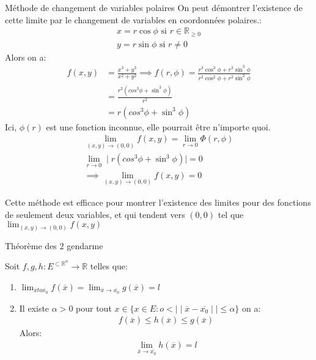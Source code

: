  \begin{parag}{Méthode de changement de variables polaires}
     On peut démontrer l'existence de cette limite par le changement de variables en coordonnées polaires.:
     \begin{align*}
         x = r\cos \phi \text{ si } r \in \mathbb{R}_{ \geq 0}\\
         y = r\sin \phi \text{ si } r \neq 0
     \end{align*}
     Alors on a:
     \begin{align*}
         f(x, y) &= \frac{x^3 + y^3}{x^2 + y^2} \implies f(r, \phi) = \frac{r^3\cos^3\phi + r^3\sin^3\phi}{r^2\cos^2\phi + r^2\sin^2\phi}\\
         &= \frac{r^2(cos^3\phi + \sin^3\phi)}{r^2}\\
         &= r(cos^3\phi + \sin^3\phi)
     \end{align*}
     Ici, $\phi(r)$ est une fonction inconnue, elle pourrait être n'importe quoi.
     \begin{align*}
         \lim_{(x, y) \to (0, 0)}f(x, y) = \lim_{r \to 0} \Phi(r, \phi)\\
         \lim_{r \to 0}\mid r (cos^3\phi + \sin^3\phi) \mid = 0\\
         \implies \lim_{(x, y) \to (0, 0)} f(x, y) = 0
     \end{align*}
     
     
     \begin{framedremark}
         Cette méthode est efficace pour montrer l'existence des limites pour des fonctions de seulement deux variables, et qui tendent vers $(0, 0)$ tel que $\lim_{(x, y) \to (0, 0)} f(x, y)$
     \end{framedremark}
     
     
 
 \end{parag}
\begin{parag}{Théorème des $2$ gendarme}
    \begin{theoreme}
        Soit $f, g, h: E^{\subset \mathbb{R}^n } \to \mathbb{R}$ telles que:
        \begin{enumerate}
            \item $\lim_{ \overline{x} to \overline{x_0}}f( \overline{x}) = \lim_{ \overline{x} \to \overline{x_0}} g( \overline{x}) = l$
            \item Il existe $ \alpha > 0$ pour tout $x \in \{ x \in E: o < \mid \mid \overline{x}- \overline{x_0} \mid \mid \leq \alpha\}$ on a:
                \begin{align*}
                    f( \overline{x}) \leq h( \overline{x}) \leq g( \overline{x})
                \end{align*}
       Alors:
       \begin{align*}
           \lim_{ \overline{x} \to \overline{x_0}}h( \overline{x}) = l
       \end{align*}
        \end{enumerate}
    \end{theoreme}
    
\end{parag}
 
